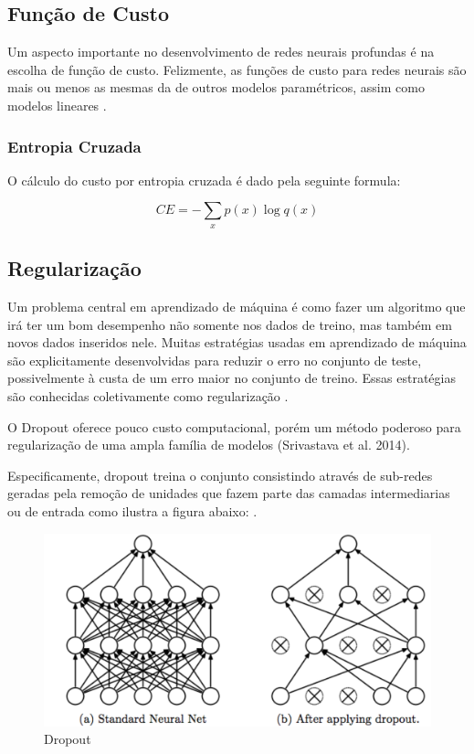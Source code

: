 \documentclass[12pt]{article}
\begin{document}
\subsection{Função de Custo}

Um aspecto importante no desenvolvimento de redes neurais profundas é na escolha de função de custo. Felizmente, as funções de custo para redes neurais são mais ou menos as mesmas da de outros modelos paramétricos, assim como modelos lineares \cite{Goodfellow-et-al-2016}.

\subsubsection{Entropia Cruzada}

O cálculo do custo por entropia cruzada é dado pela seguinte formula:

\begin{equation}
    CE = -\sum\limits_{x} p(x)\log q(x)
\end{equation}

\subsection{Regularização}

Um problema central em aprendizado de máquina é como fazer um algoritmo que irá ter um bom desempenho não somente nos dados de treino, mas também em novos dados inseridos nele. Muitas estratégias usadas em aprendizado de máquina são explicitamente desenvolvidas para reduzir o erro no conjunto de teste, possivelmente à custa de um erro maior no conjunto de treino. Essas estratégias são conhecidas coletivamente como regularização \cite{Goodfellow-et-al-2016}.

O Dropout oferece pouco custo computacional, porém um método poderoso para regularização de uma ampla família de modelos (Srivastava et al. 2014).

Especificamente, dropout treina o conjunto consistindo através de sub-redes geradas pela remoção de unidades que fazem parte das camadas intermediarias ou de entrada como ilustra a figura abaixo: \cite{Goodfellow-et-al-2016}.

\begin{figure}[ht]
\centering
\includegraphics[width=.8\textwidth]{images/dropout.png}
\caption{Dropout}
\label{fig:dropout}
\end{figure}
\end{document}
